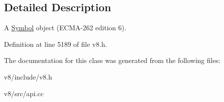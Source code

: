 \subsection{Detailed Description}
A \mbox{\hyperlink{classv8_1_1Symbol}{Symbol}} object (E\+C\+M\+A-\/262 edition 6). 

Definition at line 5189 of file v8.\+h.



The documentation for this class was generated from the following files\+:\begin{DoxyCompactItemize}
\item 
v8/include/v8.\+h\item 
v8/src/api.\+cc\end{DoxyCompactItemize}
